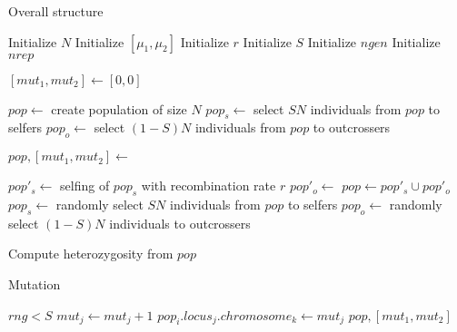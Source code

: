 \documentclass[12pt]{article}
\begin{document}
\begin{algorithm}
  \caption{Overall structure}
  \label{algo:overall}
  \begin{algorithmic}
    \State Initialize \(N\) 
    \State Initialize \([\mu_{1}, \mu_{2}]\) 
    \State Initialize \(r\) 
    \State Initialize \(S\) 
    \State Initialize \(ngen\) 
    \State Initialize \(nrep\) 

  \item


    \State \([mut_{1}, mut_{2}] \gets [0, 0]\)

    \State \(pop \gets\) create population of size \(N\)
    \State \(pop_{s} \gets\) select \(S N\) individuals from \(pop\) to selfers
    \State \(pop_{o} \gets\) select \((1 - S)N\) individuals from
    \(pop\) to outcrossers


    \State \(pop, [mut_{1}, mut_{2}] \gets\) 

  \item
    \State \(pop'_{s} \gets\) selfing of \(pop_{s}\) with
    recombination rate \(r\)
    \State \(pop'_{o} \gets\) 
    \State \(pop \gets pop'_{s} \cup pop'_{o}\)
    \State \(pop_{s} \gets\) randomly select \(SN\) individuals from
    \(pop\) to selfers
    \State \(pop_{o} \gets\) randomly select \((1 - S)N\) individuals to
    outcrossers

    \EndFor

    \State Compute heterozygosity from \(pop\)

    \EndFor

  \end{algorithmic}
\end{algorithm}

\begin{algorithm}
  \caption{Mutation}
  \label{algo:mutation}
  \begin{algorithmic}
     
     
    \If \(rng < S\)
    \State \(mut_{j} \gets mut_{j} + 1\)
    \State \(pop_{i}.locus_{j}.chromosome_{k} \gets mut_{j}\)
    \EndIf
    \EndFor
    \EndFor
    \EndFor
    \State \Return \(pop, [mut_{1}, mut_{2}]\)
    \EndFunction
  \end{algorithmic}
\end{algorithm}
\end{document}
